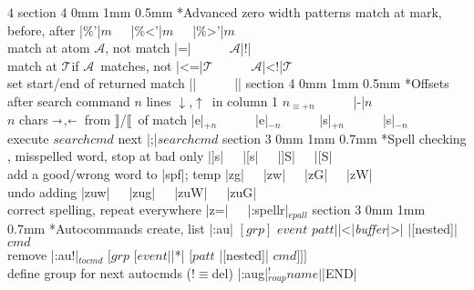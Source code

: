 \documentclass[10pt,a4paper,landscape]{article}
\makeatletter
\renewcommand{\section}{\@startsection		%
	{section}
	{3}
	{0mm}
	{1mm}
	{0.7mm}
	{\normalfont\bfseries\footnotesize}}
\renewcommand{\subsection}{\@startsection
	{section}
	{4}
	{0mm}
	{1mm}
	{0.5mm}
	{\normalfont\bfseries\scriptsize}}
\newcommand{\toleft}{$\shortleftarrow$}
\newcommand{\toright}{$\shortrightarrow$}
\newcommand{\up}{$\uparrow$}
\newcommand{\down}{$\downarrow$}
\newcommand{\ibeg}{$\llbracket$}
\newcommand{\iend}{$\rrbracket$}
\newcommand{\enbeg}[1]{\iend/\ibeg~of #1}
\newcommand{\eqv}[1]{$_{\equiv #1}$}
\newcommand{\opt}[1]{$_{#1}$}
\newcommand{\OPT}[2]{$_{#1}^{#2}$}
\newcommand{\A}{{\footnotesize$\mathcal{A}$}}
\newcommand{\T}{{\footnotesize$\mathcal{T}$}}
\newcommand{\w}{{~~~}}
\newcommand{\next}{{\small\leftpointright}}
\newcommand{\prev}{{\small\rightpointleft}}
\makeatother
\begin{document}
\begin{multicols}{4}
\subsection*{Advanced zero width patterns}
match at mark, before, after	    \dotfill|\%'|$m$\w|\%<'|$m$\w|\%>'|$m$\\
match at atom \A, not match	    \dotfill\A|\@=|\w\w\A|\@!|\\
match at \T if \A~matches, not	    \dotfill\A|\@<=|\T\w\w\A|\@<!|\T\\
set start/end of returned match	    \dotfill|\zs|\w\w|\ze|
\subsection*{Offsets after search command}
$n$ lines \down,\up~in column 1	    \dotfill$n$\eqv{+n}\w\w|-|$n$\\
$n$ chars \toright,\toleft~from \enbeg{match}	\dotfill|e|\opt{+n}\w\w|e|\opt{-n}\w\w|s|\opt{+n}\w\w|s|\opt{-n}\\
execute $searchcmd$ next		    \dotfill|;|$searchcmd$
\section*{Spell checking}
\next, \prev misspelled word, stop at bad only	\dotfill|]s|\w|[s|\w|]S|\w|[S|\\
add a good/wrong word to |spf|; temp	\dotfill|zg|\w|zw|\w|zG|\w|zW|\\
undo adding				\dotfill|zuw|\w|zug|\w|zuW|\w|zuG|\\
correct spelling, repeat everywhere     \dotfill|z=|\w|:spellr|\opt{epall}
\section*{Autocommands}
create, list	\dotfill|:au| $[grp]$ $event$ $patt{\vert}$|<|\emph{buffer}|>| |[nested]| $cmd$\\
remove	\dotfill|:au!|\opt{tocmd} $[grp$ $[event{\vert}$|*| $[patt$ |[nested]| $cmd]]]$\\
define group for next autocmds (!$\equiv$del)    \dotfill|:aug|\OPT{roup}{!}$name\vert$|END|

\end{multicols}
\end{document}
